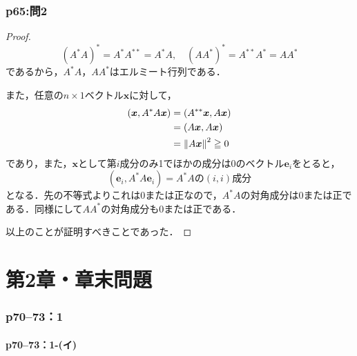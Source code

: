 \documentclass[a4paper,10pt,fleqn]{ltjsarticle}
\begin{document}
\section*{p65:問2}

\begin{tleftbar}
    \begin{proof}
        \[
            (A^\ast A)^{\ast} = A^{\ast} A^{\ast \ast} = A^{\ast} A, \quad (A A^{\ast})^\ast = A^{\ast \ast} A^\ast =A A^{\ast}
        \]
        であるから，$A^\ast A$，$A A^{\ast}$はエルミート行列である．

        また，任意の$n \times 1$ベクトル$\bm{x}$に対して，
        \begin{align*}
            (\bm{x}, A^{\ast}A \bm{x}) & = (A^{\ast \ast} \bm{x}, A \bm{x}) \\
                                       & = (A \bm{x}, A \bm{x})             \\
                                       & = \norm{A \bm{x}}^2 \geqq 0
        \end{align*}
        であり，また，$\bm{x}$として第$i$成分のみ1でほかの成分は$0$のベクトル$\bm{e}_i$をとると，
        \[
            (\bm{e}_i, A^{\ast}A \bm{e}_i) = \text{$A^{\ast}A$の$(i,i)$成分}
        \]
        となる．先の不等式よりこれは$0$または正なので，$A^{\ast}A$の対角成分は$0$または正である．同様にして$AA^{\ast}$の対角成分も$0$または正である．

        以上のことが証明すべきことであった．
    \end{proof}
\end{tleftbar}

\newpage
\part*{第2章・章末問題}

\section*{p70--73：1}

\subsection*{p70--73：1-(イ)}
\end{document}
